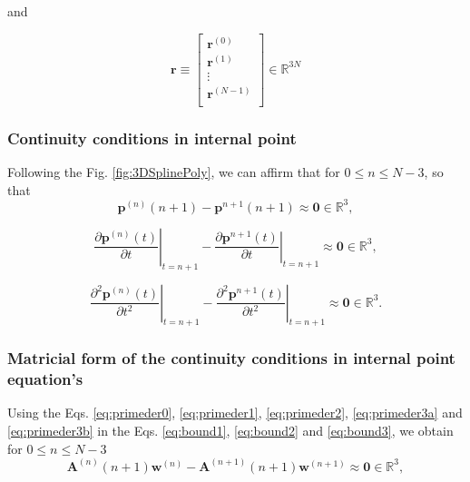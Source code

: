 and

\begin{equation}\label{eq:rvec}
\mathbf{r}
\equiv
\begin{bmatrix}
\mathbf{r}^{(0)}\\
\mathbf{r}^{(1)}\\
\vdots\\
\mathbf{r}^{(N-1)}\\
\end{bmatrix}
\in \mathbb{R}^{3N}
\end{equation}


\subsubsection{Continuity conditions in internal point}
Following the Fig. \ref{fig:3DSplinePoly}, 
we can affirm that for $0 \leq n\leq N-3$,
so that
\begin{equation}\label{eq:bound1}
\mathbf{p}^{(n)}(n+1)-\mathbf{p}^{n+1}(n+1)
\approx
\mathbf{0}\in \mathbb{R}^{3},
\end{equation}

\begin{equation}\label{eq:bound2}
\left.\frac{\partial\mathbf{p}^{(n)}(t)}{\partial t}\right|_{t=n+1}
-
\left.\frac{\partial\mathbf{p}^{n+1}(t)}{\partial t}\right|_{t=n+1}
\approx\mathbf{0}\in \mathbb{R}^{3},
\end{equation}

\begin{equation}\label{eq:bound3}
\left.\frac{\partial^{2}\mathbf{p}^{(n)}(t)}{\partial t^{2}}\right|_{t=n+1}
-
\left.\frac{\partial^{2}\mathbf{p}^{n+1}(t)}{\partial t^{2}}\right|_{t=n+1}
\approx\mathbf{0}\in \mathbb{R}^{3}.
\end{equation}

\subsubsection{Matricial form of the continuity conditions in internal point equation's}
Using %
the Eqs. \ref{eq:primeder0}, \ref{eq:primeder1}, \ref{eq:primeder2}, \ref{eq:primeder3a} and \ref{eq:primeder3b} in 
the Eqs. \ref{eq:bound1}, \ref{eq:bound2} and \ref{eq:bound3},
we obtain for $0 \leq n\leq N-3$
\begin{equation}
 \mathbf{A}^{(n)}(n+1) \mathbf{w}^{(n)} - \mathbf{A}^{(n+1)}(n+1) \mathbf{w}^{(n+1)} 
 \approx
 \mathbf{0} \in \mathbb{R}^{3},
\end{equation}

